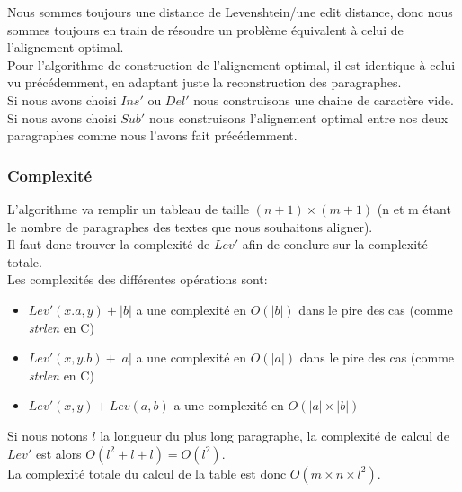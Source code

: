 \documentclass{article}
\begin{document}
Nous sommes toujours une distance de Levenshtein/une edit distance, donc nous
sommes toujours en train de résoudre un problème équivalent à celui de
l'alignement optimal.\\

Pour l'algorithme de construction de l'alignement optimal, il est identique à
celui vu précédemment, en adaptant juste la reconstruction des paragraphes.\\
Si nous avons choisi $Ins'$ ou $Del'$ nous construisons une chaine de caractère
vide.\\
Si nous avons choisi $Sub'$ nous construisons l'alignement optimal entre nos
deux paragraphes comme nous l'avons fait précédemment.

\subsubsection{Complexité}

L'algorithme va remplir un tableau de taille $(n+1) \times (m+1)$ (n et m étant le nombre de
paragraphes des textes que nous souhaitons aligner).\\
Il faut donc trouver la complexité de $Lev'$ afin de conclure sur la complexité
totale.\\
Les complexités des différentes opérations sont:
\begin{itemize}
	\item $Lev'(x.a,y) + \lvert b \rvert$ a une complexité en $O(\lvert b
		\rvert)$ dans le pire des cas (comme \textit{strlen} en C) 
	\item $Lev'(x,y.b) + \lvert a \rvert$ a une complexité en $O(\lvert a
		\rvert)$ dans le pire des cas (comme \textit{strlen} en C) 
	\item $Lev'(x,y) + Lev(a,b)$ a une complexité en $O( \lvert a \rvert \times
		\lvert b \rvert)$
\end{itemize}

Si nous notons $l$ la longueur du plus long paragraphe, la complexité de calcul
de $Lev'$ est alors $O(l^2+l+l) = O(l^2)$.\\
La complexité totale du calcul de la table est donc $O(m \times n \times l^2)$.\\
\end{document}
